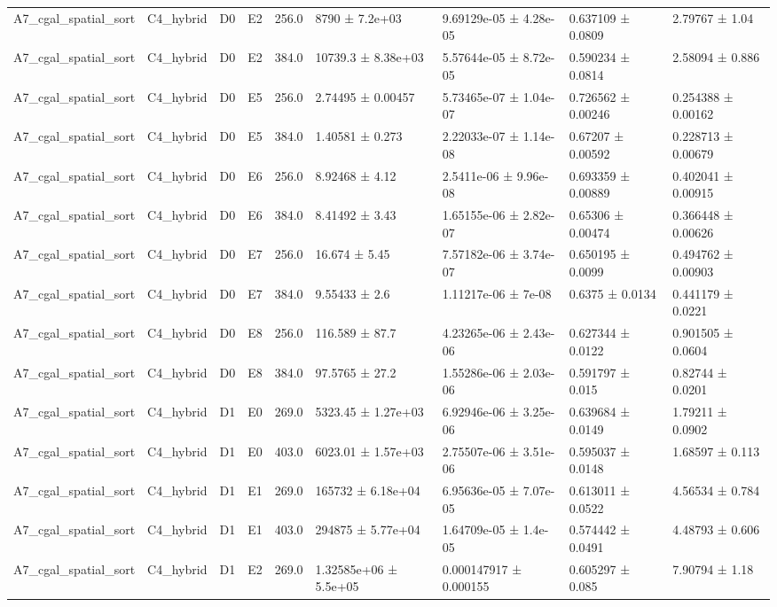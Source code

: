 \begin{table}
\begin{tabular}{lllllllll}
A7\_cgal\_spatial\_sort & C4\_hybrid & D0 & E2 & 256.0 & 8790 ± 7.2e+03 & 9.69129e-05 ± 4.28e-05 & 0.637109 ± 0.0809 & 2.79767 ± 1.04 \\
A7\_cgal\_spatial\_sort & C4\_hybrid & D0 & E2 & 384.0 & 10739.3 ± 8.38e+03 & 5.57644e-05 ± 8.72e-05 & 0.590234 ± 0.0814 & 2.58094 ± 0.886 \\
A7\_cgal\_spatial\_sort & C4\_hybrid & D0 & E5 & 256.0 & 2.74495 ± 0.00457 & 5.73465e-07 ± 1.04e-07 & 0.726562 ± 0.00246 & 0.254388 ± 0.00162 \\
A7\_cgal\_spatial\_sort & C4\_hybrid & D0 & E5 & 384.0 & 1.40581 ± 0.273 & 2.22033e-07 ± 1.14e-08 & 0.67207 ± 0.00592 & 0.228713 ± 0.00679 \\
A7\_cgal\_spatial\_sort & C4\_hybrid & D0 & E6 & 256.0 & 8.92468 ± 4.12 & 2.5411e-06 ± 9.96e-08 & 0.693359 ± 0.00889 & 0.402041 ± 0.00915 \\
A7\_cgal\_spatial\_sort & C4\_hybrid & D0 & E6 & 384.0 & 8.41492 ± 3.43 & 1.65155e-06 ± 2.82e-07 & 0.65306 ± 0.00474 & 0.366448 ± 0.00626 \\
A7\_cgal\_spatial\_sort & C4\_hybrid & D0 & E7 & 256.0 & 16.674 ± 5.45 & 7.57182e-06 ± 3.74e-07 & 0.650195 ± 0.0099 & 0.494762 ± 0.00903 \\
A7\_cgal\_spatial\_sort & C4\_hybrid & D0 & E7 & 384.0 & 9.55433 ± 2.6 & 1.11217e-06 ± 7e-08 & 0.6375 ± 0.0134 & 0.441179 ± 0.0221 \\
A7\_cgal\_spatial\_sort & C4\_hybrid & D0 & E8 & 256.0 & 116.589 ± 87.7 & 4.23265e-06 ± 2.43e-06 & 0.627344 ± 0.0122 & 0.901505 ± 0.0604 \\
A7\_cgal\_spatial\_sort & C4\_hybrid & D0 & E8 & 384.0 & 97.5765 ± 27.2 & 1.55286e-06 ± 2.03e-06 & 0.591797 ± 0.015 & 0.82744 ± 0.0201 \\
A7\_cgal\_spatial\_sort & C4\_hybrid & D1 & E0 & 269.0 & 5323.45 ± 1.27e+03 & 6.92946e-06 ± 3.25e-06 & 0.639684 ± 0.0149 & 1.79211 ± 0.0902 \\
A7\_cgal\_spatial\_sort & C4\_hybrid & D1 & E0 & 403.0 & 6023.01 ± 1.57e+03 & 2.75507e-06 ± 3.51e-06 & 0.595037 ± 0.0148 & 1.68597 ± 0.113 \\
A7\_cgal\_spatial\_sort & C4\_hybrid & D1 & E1 & 269.0 & 165732 ± 6.18e+04 & 6.95636e-05 ± 7.07e-05 & 0.613011 ± 0.0522 & 4.56534 ± 0.784 \\
A7\_cgal\_spatial\_sort & C4\_hybrid & D1 & E1 & 403.0 & 294875 ± 5.77e+04 & 1.64709e-05 ± 1.4e-05 & 0.574442 ± 0.0491 & 4.48793 ± 0.606 \\
A7\_cgal\_spatial\_sort & C4\_hybrid & D1 & E2 & 269.0 & 1.32585e+06 ± 5.5e+05 & 0.000147917 ± 0.000155 & 0.605297 ± 0.085 & 7.90794 ± 1.18 \\

\end{tabular}
\end{table}
